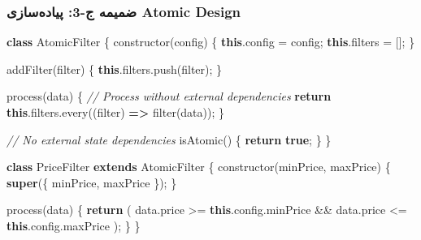 \documentclass[
]{article}
\newenvironment{Shaded}{}{}
\newcommand{\AttributeTok}[1]{\textcolor[rgb]{0.49,0.56,0.16}{#1}}
\newcommand{\BuiltInTok}[1]{\textcolor[rgb]{0.00,0.50,0.00}{#1}}
\newcommand{\CommentTok}[1]{\textcolor[rgb]{0.38,0.63,0.69}{\textit{#1}}}
\newcommand{\ControlFlowTok}[1]{\textcolor[rgb]{0.00,0.44,0.13}{\textbf{#1}}}
\newcommand{\FunctionTok}[1]{\textcolor[rgb]{0.02,0.16,0.49}{#1}}
\newcommand{\KeywordTok}[1]{\textcolor[rgb]{0.00,0.44,0.13}{\textbf{#1}}}
\newcommand{\NormalTok}[1]{#1}
\newcommand{\OperatorTok}[1]{\textcolor[rgb]{0.40,0.40,0.40}{#1}}
\begin{document}
\subsubsection{ضمیمه ج-3: پیاده‌سازی Atomic
Design}\label{ux636ux645ux6ccux645ux647-ux62c-3-ux67eux6ccux627ux62fux647ux633ux627ux632ux6cc-atomic-design}

\begin{Shaded}
\begin{Highlighting}[]
\KeywordTok{class}\NormalTok{ AtomicFilter \{}
  \FunctionTok{constructor}\NormalTok{(config) \{}
    \KeywordTok{this}\OperatorTok{.}\AttributeTok{config} \OperatorTok{=}\NormalTok{ config}\OperatorTok{;}
    \KeywordTok{this}\OperatorTok{.}\AttributeTok{filters} \OperatorTok{=}\NormalTok{ []}\OperatorTok{;}
\NormalTok{  \}}

  \FunctionTok{addFilter}\NormalTok{(filter) \{}
    \KeywordTok{this}\OperatorTok{.}\AttributeTok{filters}\OperatorTok{.}\FunctionTok{push}\NormalTok{(filter)}\OperatorTok{;}
\NormalTok{  \}}

  \BuiltInTok{process}\NormalTok{(data) \{}
    \CommentTok{// Process without external dependencies}
    \ControlFlowTok{return} \KeywordTok{this}\OperatorTok{.}\AttributeTok{filters}\OperatorTok{.}\FunctionTok{every}\NormalTok{((filter) }\KeywordTok{=\textgreater{}} \FunctionTok{filter}\NormalTok{(data))}\OperatorTok{;}
\NormalTok{  \}}

  \CommentTok{// No external state dependencies}
  \FunctionTok{isAtomic}\NormalTok{() \{}
    \ControlFlowTok{return} \KeywordTok{true}\OperatorTok{;}
\NormalTok{  \}}
\NormalTok{\}}

\KeywordTok{class}\NormalTok{ PriceFilter }\KeywordTok{extends}\NormalTok{ AtomicFilter \{}
  \FunctionTok{constructor}\NormalTok{(minPrice}\OperatorTok{,}\NormalTok{ maxPrice) \{}
    \KeywordTok{super}\NormalTok{(\{ minPrice}\OperatorTok{,}\NormalTok{ maxPrice \})}\OperatorTok{;}
\NormalTok{  \}}

  \BuiltInTok{process}\NormalTok{(data) \{}
    \ControlFlowTok{return}\NormalTok{ (}
\NormalTok{      data}\OperatorTok{.}\AttributeTok{price} \OperatorTok{\textgreater{}=} \KeywordTok{this}\OperatorTok{.}\AttributeTok{config}\OperatorTok{.}\AttributeTok{minPrice} \OperatorTok{\&\&}\NormalTok{ data}\OperatorTok{.}\AttributeTok{price} \OperatorTok{\textless{}=} \KeywordTok{this}\OperatorTok{.}\AttributeTok{config}\OperatorTok{.}\AttributeTok{maxPrice}
\NormalTok{    )}\OperatorTok{;}
\NormalTok{  \}}
\NormalTok{\}}
\end{Highlighting}
\end{Shaded}
\end{document}
